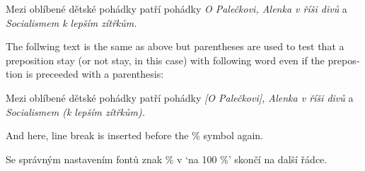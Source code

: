 \documentclass{article}
\newcommand{\expl}[1]{\begin{english}\sffamily #1\end{english}}
\begin{document}
\cstypoSingleLetterDisable{}
\cstypoPercentsDisable{}
\cstypoALetterDisable{}

Mezi oblíbené dětské pohádky patří pohádky \emph{O Palečkovi, Alenka v říši
  divů} a \emph{Socialismem k lepším zítřkům.}

\expl{The follwing text is the same as above but parentheses are used to test
  that a preposition stay (or not stay, in this case) with following word
  even if the prepostion is preceeded with a parenthesis:}

Mezi oblíbené dětské pohádky patří pohádky \emph{[O Palečkovi], Alenka v říši
  divů} a \emph{Socialismem (k lepším zítřkům).}

\expl{And here, line break is inserted before the \% symbol again.}

Se správným nastavením fontů znak \% v `na 100 \%' skončí na další řádce.
\end{document}
